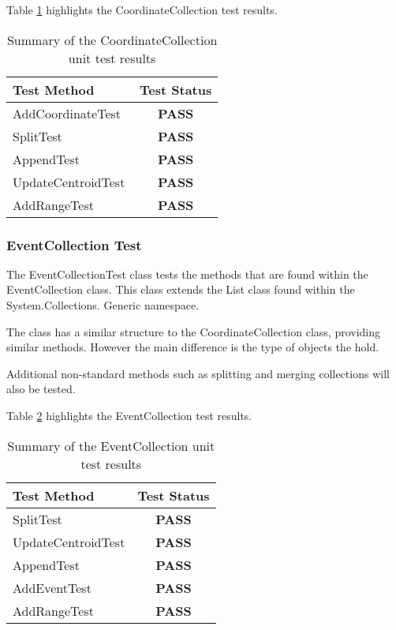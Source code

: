 Table \ref{tab:coordinate_collection_test} highlights the CoordinateCollection 
test results.

\begin{table}[h]
  \centering
  \begin{tabular}{|l|c|}
    \hline
    {\bfseries Test Method} & {\bfseries Test Status} \\ 
    \hline
    AddCoordinateTest       & {\bfseries \color{OliveGreen} PASS}   \\ 
    SplitTest               & {\bfseries \color{OliveGreen} PASS}   \\ 
    AppendTest              & {\bfseries \color{OliveGreen} PASS}   \\ 
    UpdateCentroidTest      & {\bfseries \color{OliveGreen} PASS}   \\ 
    AddRangeTest            & {\bfseries \color{OliveGreen} PASS}   \\
    \hline
  \end{tabular}
  \caption[Summary of the CoordinateCollection unit test results]
          {Summary of the CoordinateCollection unit test results}
  \label{tab:coordinate_collection_test}
\end{table}


\subsubsection{EventCollection Test}

The {\ttfamily EventCollectionTest} class tests the methods that are found 
within the EventCollection class. This class extends the List class found
within the {\ttfamily System.Collections. Generic} namespace.

The class has a similar structure to the {\ttfamily CoordinateCollection} 
class, providing similar methods. However the main difference is the type of 
objects the hold.

Additional non-standard methods such as splitting and merging collections will 
also be tested.

Table \ref{tab:event_collection_test} highlights the EventCollection test 
results.

\begin{table}[h]
  \centering
  \begin{tabular}{|l|c|}
    \hline
    {\bfseries Test Method} & {\bfseries Test Status} \\ 
    \hline
    SplitTest               & {\bfseries \color{OliveGreen} PASS}   \\ 
    UpdateCentroidTest      & {\bfseries \color{OliveGreen} PASS}   \\ 
    AppendTest              & {\bfseries \color{OliveGreen} PASS}   \\ 
    AddEventTest            & {\bfseries \color{OliveGreen} PASS}   \\ 
    AddRangeTest            & {\bfseries \color{OliveGreen} PASS}   \\
    \hline
  \end{tabular}
  \caption[Summary of the EventCollection unit test results]
          {Summary of the EventCollection unit test results}
  \label{tab:event_collection_test}
\end{table}


